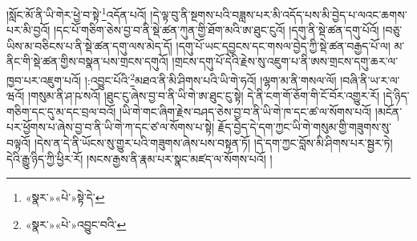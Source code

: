 །སློང་མོ་ནི་ཡི་གེར་ཕྱེ་བ་སྟེ་\footnote{«སྣར་»«པེ་»སྟེ་དེ་}འདོན་པའོ། །དེ་ལྟ་བུ་ནི་སྔགས་པའི་བཟླས་པར་མི་འདོད་པས་མི་བྱེད་པ་ལའང་ཆགས་པར་མི་བྱའོ། །དང་པོ་གཅིག་ཅེས་བྱ་བ་ནི་སྡེ་ཚན་ཀུན་གྱི་ཐོག་མའི་ཨ་ཐུང་ངུའོ། །དགུ་ནི་སྡེ་ཚན་དགུ་པོའོ། །བཅུ་ཡིས་མ་བཅིངས་པ་ནི་སྡེ་ཚན་དགུ་ལས་མེད་དོ། །དགུ་པོ་ཡང་དབྱངས་དང་གསལ་བྱེད་ཀྱི་སྡེ་ཚན་བརྒྱད་པོ་ལ། མ་ནིང་གི་སྡེ་ཚན་གྱིས་བསྣན་པས་གྲངས་དགུའོ། །གྲངས་དགུ་པོ་དེའི་རྗེས་སུ་འཇུག་པ་ནི་ཨས་གྲངས་དགུ་ཆར་ལ་ཁྱབ་པར་འཇུག་པའོ། །:འབྱུང་པོའི་\footnote{«སྣར་»«པེ་»འབྱུང་བའི་}མཐའ་ནི་མི་ཤིགས་པའི་ཡི་གེ་ཧའོ། །ལྷག་མ་ནི་གསལ་ལོ། །བཞི་ནི་ཡ་ར་ལ་ཝའོ། །གསུམ་ནི་ཤ་ཥ་སའོ། །ཐུང་ངུ་ཞེས་བྱ་བ་ནི་ཡི་གེ་ཨ་ཐུང་ངུ་སྟེ། དེ་ནི་ངག་གོ་ཅོག་གི་ངོ་བོར་འགྱུར་རོ། །དེ་ཉིད་གཅིག་དང་དུ་མ་དང་བྲལ་བའོ། །ཡི་གེ་གང་ཞིག་རྗེས་བཤད་ཅེས་བྱ་བ་ནི་ཡི་གེ་ཁ་དང་ཚ་ལ་སོགས་པའོ། །མངོན་པར་ཕྱོགས་པ་ཞེས་བྱ་བ་ནི་ཡི་གེ་ཀ་དང་ཙ་ལ་སོགས་པ་སྟེ། རྗོད་བྱེད་དེ་དག་ཀྱང་ཡི་གེ་གསུམ་གྱི་གཟུགས་སུ་བལྟའོ། །དེས་ན་དེ་ནི་ཡོངས་སུ་གྱུར་པའི་གཟུགས་ཞེས་པས་བསྟན་ཏོ། །དེ་དག་ཀྱང་བློས་མི་ཤིགས་པར་སྦྱར་ཏེ། དེའི་རྒྱུ་ཉིད་ཀྱི་ཕྱིར་རོ། །སངས་རྒྱས་ནི་རྣམ་པར་སྣང་མཛད་ལ་སོགས་པའོ། །
